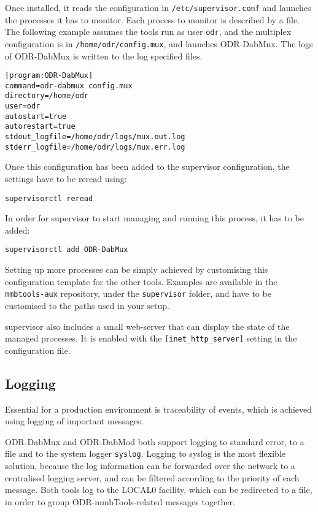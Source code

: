 Once installed, it reads the configuration in \texttt{/etc/supervisor.conf} and
launches the processes it has to monitor. Each process to monitor is described
by a file. The following example assumes the tools run as user \texttt{odr}, and
the multiplex configuration is in
\texttt{/home/odr/config.mux}, and launches ODR-DabMux.
The logs of ODR-DabMux is written to the log specified files.

\begin{lstlisting}
[program:ODR-DabMux]
command=odr-dabmux config.mux
directory=/home/odr
user=odr
autostart=true
autorestart=true
stdout_logfile=/home/odr/logs/mux.out.log
stderr_logfile=/home/odr/logs/mux.err.log
\end{lstlisting}

Once this configuration has been added to the supervisor configuration, the
settings have to be reread using:
\begin{lstlisting}
supervisorctl reread
\end{lstlisting}

In order for supervisor to start managing and running this process, it has to be added:
\begin{lstlisting}
supervisorctl add ODR-DabMux
\end{lstlisting}

Setting up more processes can be simply achieved by customising this
configuration template for the other tools. Examples are available in the
\texttt{mmbtools-aux} repository, under the \texttt{supervisor} folder, and have
to be customised to the paths used in your setup.

supervisor also includes a small web-server that can display the state of the
managed processes. It is enabled with the \verb+[inet_http_server]+ setting in
the configuration file.

\subsection{Logging}
Essential for a production environment is traceability of events, which is
achieved using logging of important messages.

ODR-DabMux and ODR-DabMod both support logging to standard error, to a file and
to the system logger \texttt{syslog}. Logging to syslog is the most flexible
solution, because the log information can be forwarded over the network to a
centralised logging server, and can be filtered according to the priority of
each message. Both tools log to the LOCAL0 facility, which can be redirected to
a file, in order to group ODR-mmbTools-related messages together.

